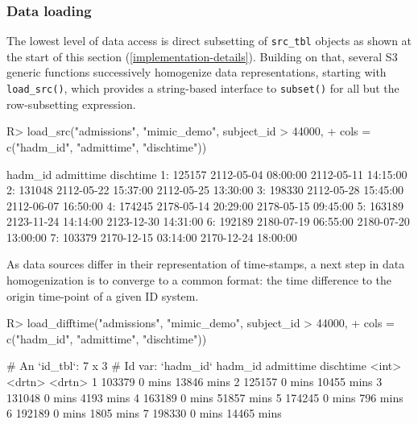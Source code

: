 \documentclass[
]{jss}
\begin{document}
\hypertarget{data-loading}{%
\subsubsection{Data loading}\label{data-loading}}

The lowest level of data access is direct subsetting of
\texttt{src\_tbl} objects as shown at the start of this section
(\ref{implementation-details}). Building on that, several S3 generic
functions successively homogenize data representations, starting with
\texttt{load\_src()}, which provides a string-based interface to
\texttt{subset()} for all but the row-subsetting expression.

\begin{CodeChunk}
\begin{CodeInput}
R> load_src("admissions", "mimic_demo", subject_id > 44000,
+          cols = c("hadm_id", "admittime", "dischtime"))
\end{CodeInput}
\begin{CodeOutput}
   hadm_id           admittime           dischtime
1:  125157 2112-05-04 08:00:00 2112-05-11 14:15:00
2:  131048 2112-05-22 15:37:00 2112-05-25 13:30:00
3:  198330 2112-05-28 15:45:00 2112-06-07 16:50:00
4:  174245 2178-05-14 20:29:00 2178-05-15 09:45:00
5:  163189 2123-11-24 14:14:00 2123-12-30 14:31:00
6:  192189 2180-07-19 06:55:00 2180-07-20 13:00:00
7:  103379 2170-12-15 03:14:00 2170-12-24 18:00:00
\end{CodeOutput}
\end{CodeChunk}

As data sources differ in their representation of time-stamps, a next
step in data homogenization is to converge to a common format: the time
difference to the origin time-point of a given ID system.

\begin{CodeChunk}
\begin{CodeInput}
R> load_difftime("admissions", "mimic_demo", subject_id > 44000,
+               cols = c("hadm_id", "admittime", "dischtime"))
\end{CodeInput}
\end{CodeChunk}

\begin{CodeChunk}
\begin{CodeOutput}
# An `id_tbl`: 7 x 3
# Id var:      `hadm_id`
  hadm_id admittime dischtime
    <int> <drtn>    <drtn>
1  103379 0 mins    13846 mins
2  125157 0 mins    10455 mins
3  131048 0 mins     4193 mins
4  163189 0 mins    51857 mins
5  174245 0 mins      796 mins
6  192189 0 mins     1805 mins
7  198330 0 mins    14465 mins
\end{CodeOutput}
\end{CodeChunk}
\end{document}
